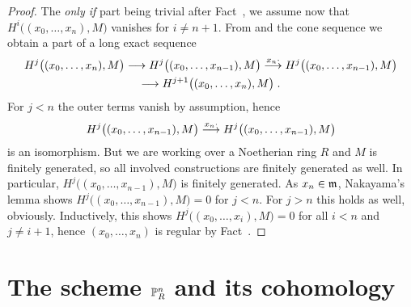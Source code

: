 \documentclass[a4paper,parskip=half,numbers=enddot, DIV=12]{scrreprt}
\begin{document}
\begin{proof}
	The \emph{only if} part being trivial after Fact~, we assume now that $H^i\big((x_0,\ldots,x_n),M\big)$ vanishes for $i\neq n+1$. From  and the cone sequence  we obtain a part of a long exact sequence
	\begin{multline*}
	H^j\big((x_0,\ldots,x_n),M\big)\morphism H^j\big((x_0,\ldots,x_{n-1}),M\big)\morphism[x_n\cdot] H^j\big((x_0,\ldots,x_{n-1}),M\big)\\
	\morphism H^{j+1}\big((x_0,\ldots,x_n),M\big)\;.
	\end{multline*}
	For $j<n$ the outer terms vanish by assumption, hence
	\begin{align*}
	H^j\big((x_0,\ldots,x_{n-1}),M\big)\morphism[x_n\cdot] H^j\big((x_0,\ldots,x_{n-1}),M\big)
	\end{align*}
	is an isomorphism. But we are working over a Noetherian ring $R$ and $M$ is finitely generated, so all involved constructions are finitely generated as well. In particular, $H^j\big((x_0,\ldots,x_{n-1}),M\big)$ is finitely generated. As $x_n\in\mathfrak{m}$, Nakayama's lemma shows $H^j\big((x_0,\ldots,x_{n-1}),M\big)=0$ for $j<n$. For $j>n$ this holds as well, obviously. Inductively, this shows $H^j\big((x_0,\ldots,x_i),M\big)=0$ for all $i<n$ and $j\neq i+1$, hence $(x_0,\ldots,x_n)$ is regular by Fact~.			
\end{proof}

\section{The scheme \texorpdfstring{$\mathbb{P}_R^n$}{P} and its cohomology}
\end{document}
